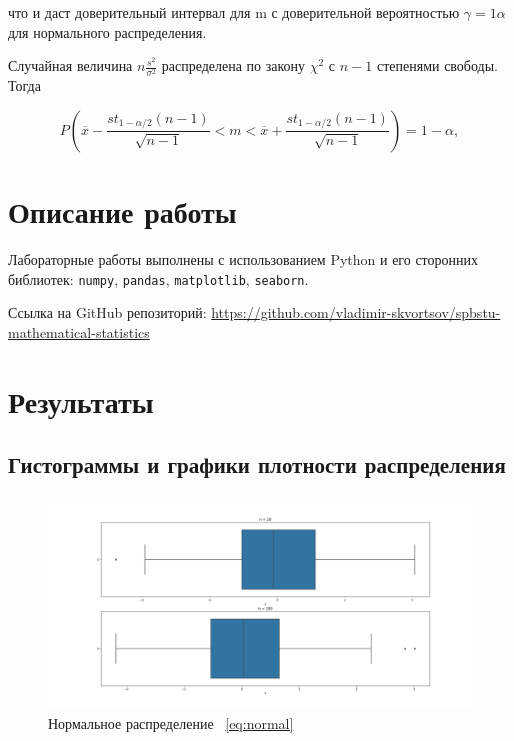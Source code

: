 \documentclass[12pt,a4paper]{article}
\begin{document}
	что и даст доверительный интервал для m с доверительной вероятностью $\gamma = 1 \alpha$ для нормального распределения.

	Случайная величина $n \frac{s^2}{\sigma^2}$ распределена по закону $\chi^2$ с $n - 1$ степенями свободы. Тогда

	\begin{equation} \label{eq:mean_boundaries}
		P \left ( \overline x - \frac{st_{1 - \alpha / 2}(n - 1)}{\sqrt{n - 1}} < m < \overline x + \frac{st_{1 - \alpha / 2}(n - 1)}{\sqrt{n - 1}} \right ) = 1 - \alpha,
	\end{equation}

	\section{Описание работы}

	Лабораторные работы выполнены с использованием Python и его сторонних библиотек: \verb!numpy!, \verb!pandas!, \verb!matplotlib!, \verb!seaborn!.

	Ссылка на GitHub репозиторий: \href{https://github.com/vladimir-skvortsov/spbstu-mathematical-statistics}{https://github.com/vladimir-skvortsov/spbstu-mathematical-statistics}

	\newpage

	\section{Результаты}

	\subsection{Гистограммы и графики плотности распределения}

	\begin{figure}[htbp!]
		\begin{center}
			\includegraphics[width = 1.12\linewidth]{graphics/lab2_normal.png}
			\caption{Нормальное распределение \ \eqref{eq:normal}}
		\end{center}
	\end{figure}
\end{document}
